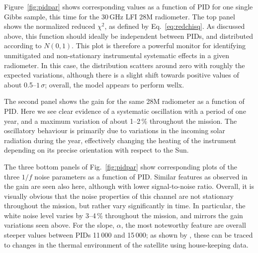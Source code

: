\documentclass[twocolumn]{aa}
\renewcommand{\d}[0]{\vec{d}}
\newcommand{\s}[0]{\vec{s}}
\newcommand{\BP}{\textsc{BeyondPlanck}}
\begin{document}
Figure~\ref{fig:pidpar} shows corresponding values as a function of
PID for one single Gibbs sample, this time for the 30\,GHz LFI 28M
radiometer. The top panel shows the normalized reduced $\chi^2$, as
defined by Eq.~\eqref{eq:redchisq}. As discussed above, this function
should ideally be independent between PIDs, and distributed according
to $N(0,1)$. This plot is therefore a powerful monitor for identifying
unmitigated and non-stationary instrumental systematic effects in a
given radiometer. In this case, the distribution scatters around zero
with roughly the expected variations, although there is a slight shift
towards positive values of about 0.5--$1\,\sigma$; overall, the model
appears to perform wellx.


The second panel shows the gain for the same 28M radiometer as a
function of PID. Here we see clear evidence of a systematic
oscillation with a period of one year, and a maximum variation of
about 1--2\,\% throughout the mission. The oscillatory behaviour is
primarily due to variations in the incoming solar radiation during the
year, effectively changing the heating of the instrument depending on its
precise orientation with respect to the Sun.

The three bottom panels of Fig.~\ref{fig:pidpar} show corresponding
plots of the three $1/f$ noise parameters as a function of
PID. Similar features as observed in the gain are seen also here,
although with lower signal-to-noise ratio. Overall, it is visually
obvious that the noise properties of this channel are not stationary
throughout the mission, but rather vary significantly in time. In
particular, the white noise level varies by 3--4\,\% throughout the
mission, and mirrors the gain variations seen above. For the slope,
$\alpha$, the most noteworthy feature are overall steeper values
between PIDs 11\,000 and 15\,000; as shown by \citet{bp06}, these can
be traced to changes in the thermal environment of the satellite using
house-keeping data.
\end{document}
